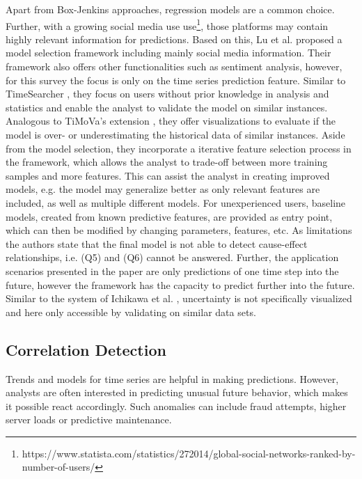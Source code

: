 \documentclass[electronic]{vgtc}             %
\begin{document}
Apart from Box-Jenkins approaches, regression models are a common choice. 
Further, with a growing social media use use\footnote{https://www.statista.com/statistics/272014/global-social-networks-ranked-by-number-of-users/}, those platforms may contain highly relevant information for predictions. 
Based on this, Lu et al. \cite{lu:2014} proposed a model selection framework including mainly social media information. 
Their framework also offers other functionalities such as sentiment analysis, however, for this survey the focus is only on the time series prediction feature.
Similar to TimeSearcher \cite{Hochheiser:2004, buono:2005, buono:2007}, they focus on users without prior knowledge in analysis and statistics and enable the analyst to validate the model on similar instances. 
Analogous to TiMoVa's extension \cite{boegl:2014}, they offer visualizations to evaluate if the model is over- or underestimating the historical data of similar instances.
Aside from the model selection, they incorporate a iterative feature selection process in the framework, which allows the analyst to trade-off between more training samples and more features. 
This can assist the analyst in creating improved models, e.g. the model may generalize better as only relevant features are included, as well as multiple different models. 
For unexperienced users, baseline models, created from known predictive features, are provided as entry point, which can then be modified by changing parameters, features, etc.
As limitations the authors state that the final model is not able to detect cause-effect relationships, i.e. (Q5) and (Q6) cannot be answered. 
Further, the application scenarios presented in the paper are only predictions of one time step into the future, however the framework has the capacity to predict further into the future.
Similar to the system of Ichikawa et al. \cite{ichikawa:2002}, uncertainty is not specifically visualized and here only accessible by validating on similar data sets.


\subsection{Correlation Detection\label{subsec:correlation}}
Trends and models for time series are helpful in making predictions.  
However, analysts are often interested in predicting unusual future behavior, which makes it possible react accordingly. 
Such anomalies can include fraud attempts, higher server loads or predictive maintenance.\\
\end{document}
